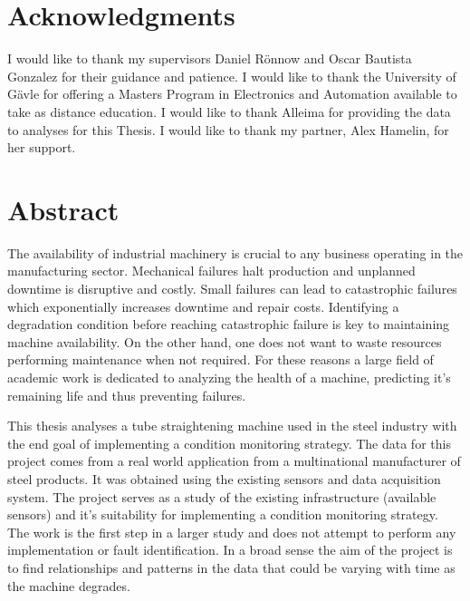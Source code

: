 \documentclass[]{article}
\begin{document}
\setmainfont{Perpetua}

\newpage
\thispagestyle{empty}
\mbox{}
\newpage
{}

\section*{Acknowledgments}
I would like to thank my supervisors Daniel Rönnow and Oscar Bautista Gonzalez for their guidance and patience. I would like to thank the University of Gävle for offering a Masters Program in Electronics and Automation available to take as distance education. I would like to thank Alleima for providing the data to analyses for this Thesis. I would like to thank my partner, Alex Hamelin, for her support.
\newpage

\section*{Abstract}
The availability of industrial machinery is crucial to any business operating in the manufacturing sector. Mechanical failures halt production and unplanned downtime is disruptive and costly. Small failures can lead to catastrophic failures which exponentially increases downtime and repair costs. Identifying a degradation condition before reaching catastrophic failure is key to maintaining machine availability. On the other hand, one does not want to waste resources performing maintenance when not required. For these reasons a large field of academic work is dedicated to analyzing the health of a machine, predicting it's remaining life and thus preventing failures.

This thesis analyses a tube straightening machine used in the steel industry with the end goal of implementing a condition monitoring strategy. The data for this project comes from a real world application from a multinational manufacturer of steel products. It was obtained using the existing sensors and data acquisition system. The project serves as a study of the existing infrastructure (available sensors) and it's suitability for implementing a condition monitoring strategy. The work is the first step in a larger study and does not attempt to perform any implementation or fault identification. In a broad sense the aim of the project is to find relationships and patterns in the data that could be varying with time as the machine degrades.
\end{document}
